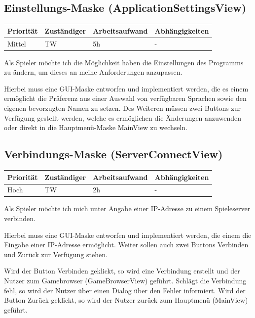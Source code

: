 \documentclass[a4paper]{scrreprt}
\newenvironment{requirement}[5] {
	\subsection{#1}
	\begin{tabularx}{\textwidth}{|X|l|X|X|}
		\hline
		Priorität & Zuständiger & Arbeitsaufwand & Abhängigkeiten \\
		\hline
		#2 & #3 & #4 & #5 \\
		\hline
	\end{tabularx}
	}{
	\newpage
	}
\begin{document}
\begin{requirement}{Einstellungs-Maske (ApplicationSettingsView)}{Mittel}{TW}{5h}{-}

\begin{center}
	Als Spieler möchte ich die Möglichkeit haben die Einstellungen des Programms zu ändern, um dieses an meine Anforderungen anzupassen.
\end{center}

Hierbei muss eine GUI-Maske entworfen und implementiert werden, die es einem ermöglicht die Präferenz aus einer Auswahl von verfügbaren Sprachen sowie den eigenen bevorzugten Namen zu setzen. Des Weiteren müssen zwei Buttons zur Verfügung gestellt werden, welche es ermöglichen die Änderungen anzuwenden oder direkt in die Hauptmenü-Maske \glqq MainView\grqq{} zu wechseln.

\end{requirement}


\begin{requirement}{Verbindungs-Maske (ServerConnectView)}{Hoch}{TW}{2h}{-}

\begin{center}
	Als Spieler möchte ich mich unter Angabe einer IP-Adresse zu einem Spieleserver verbinden.
\end{center}

Hierbei muss eine GUI-Maske entworfen und implementiert werden, die einem die Eingabe einer IP-Adresse ermöglicht. Weiter sollen auch zwei Buttons \glqq Verbinden \grqq{} und \glqq Zurück \grqq{} zur Verfügung stehen.

Wird der Button \glqq Verbinden\grqq{} geklickt, so wird eine Verbindung erstellt und der Nutzer zum Gamebrowser (\glqq GameBrowserView\grqq{})  geführt. Schlägt die Verbindung fehl, so wird der Nutzer über einen Dialog über den Fehler informiert.
Wird der Button \glqq Zurück\grqq{} geklickt, so wird der Nutzer zurück zum Hauptmenü (\glqq MainView\grqq{}) geführt.

\end{requirement}
\end{document}
